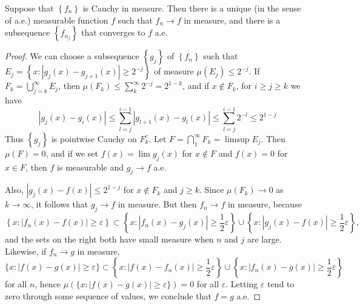 \documentclass[12pt, a4paper, oneside]{book}
\begin{document}
\begin{theorem}
    Suppose that $\left\{f_n\right\}$ is Cauchy in measure. Then there is a unique (in the sense of a.e.) measurable function $f$ such that $f_n \rightarrow f$ in measure, and there is a subsequence $\left\{f_{n_j}\right\}$ that converges to $f$ a.e.
    \begin{proof}
        We can choose a subsequence $\left\{g_j\right\}$ of $\left\{f_n\right\}$ such that $E_j= \left\{x:\left|g_j(x)-g_{j+1}(x)\right| \geq 2^{-j}\right\}$ of measure $\mu\left(E_j\right) \leq 2^{-j}$. If $F_k=\bigcup_{j=k}^{\infty} E_j$, then $\mu\left(F_k\right) \leq \sum_k^{\infty} 2^{-j}=2^{1-k}$, and if $x \notin F_k$, for $i \geq j \geq k$ we have
        \begin{equation*}
            \left|g_j(x)-g_i(x)\right| \leq \sum_{l=j}^{i-1}\left|g_{l+1}(x)-g_l(x)\right| \leq \sum_{l=j}^{i-1} 2^{-l} \leq 2^{1-j}
        \end{equation*}
        Thus $\left\{g_j\right\}$ is pointwise Cauchy on $F_k^c$. Let $F=\bigcap_1^{\infty} F_k=\limsup E_j$. Then $\mu(F)=0$, and if we set $f(x)=\lim g_j(x)$ for $x \notin F$ and $f(x)=0$ for $x \in F$, then $f$ is measurable and $g_j \rightarrow f$ a.e.

        Also, $\left|g_j(x)-f(x)\right| \leq 2^{1-j}$ for $x \notin F_k$ and $j \geq k$. Since $\mu\left(F_k\right) \rightarrow 0$ as $k \rightarrow \infty$, it follows that $g_j \rightarrow f$ in measure. But then $f_n \rightarrow f$ in measure, because
        \begin{equation*}
            \left\{x:\left|f_n(x)-f(x)\right| \geq \varepsilon\right\} \subset\left\{x:\left|f_n(x)-g_j(x)\right| \geq \frac{1}{2} \varepsilon\right\} \cup\left\{x:\left|g_j(x)-f(x)\right| \geq \frac{1}{2} \varepsilon\right\},
        \end{equation*}
        and the sets on the right both have small measure when $n$ and $j$ are large. Likewise, if $f_n \rightarrow g$ in measure,
        \begin{equation*}
            \{x:|f(x)-g(x)| \geq \varepsilon\} \subset\left\{x:\left|f(x)-f_n(x)\right| \geq \frac{1}{2} \varepsilon\right\} \cup\left\{x:\left|f_n(x)-g(x)\right| \geq \frac{1}{2} \varepsilon\right\}
        \end{equation*}
        for all $n$, hence $\mu(\{x:|f(x)-g(x)| \geq \varepsilon\})=0$ for all $\varepsilon$. Letting $\varepsilon$ tend to zero through some sequence of values, we conclude that $f=g$ a.e.
    \end{proof}
\end{theorem}
\end{document}
